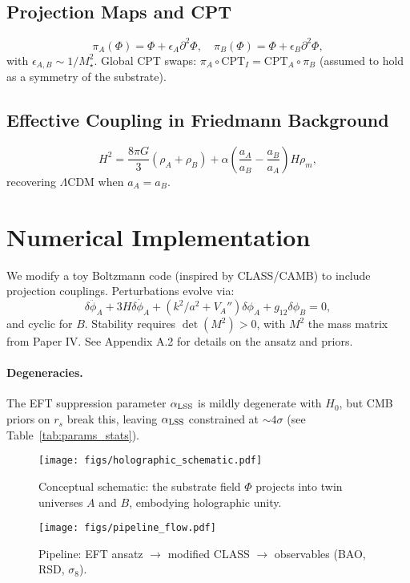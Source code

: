 \documentclass[11pt,a4paper]{article}
\begin{document}
\subsection{Projection Maps and CPT}
\begin{equation}
\pi_A(\Phi) = \Phi + \epsilon_A \partial^2 \Phi, \quad \pi_B(\Phi) = \Phi + \epsilon_B \partial^2 \Phi,
\end{equation}
with $\epsilon_{A,B} \sim 1/M_\star^2$. Global CPT swaps: $\pi_A \circ \mathrm{CPT}_I = \mathrm{CPT}_A \circ \pi_B$ (assumed to hold as a symmetry of the substrate).
\subsection{Effective Coupling in Friedmann Background}
\begin{equation}
H^2 = \frac{8\pi G}{3} (\rho_A + \rho_B) + \alpha \left( \frac{a_A}{a_B} - \frac{a_B}{a_A} \right) H \rho_m,
\end{equation}
recovering $\Lambda$CDM when $a_A = a_B$.
\section{Numerical Implementation}
We modify a toy Boltzmann code (inspired by CLASS/CAMB) to include projection couplings. Perturbations evolve via:
\begin{equation}
\ddot{\delta\phi_A} + 3H \dot{\delta\phi_A} + (k^2/a^2 + V_A'') \delta\phi_A + g_{12} \delta\phi_B = 0,
\end{equation}
and cyclic for $B$. Stability requires $\det(M^2) > 0$, with $M^2$ the mass matrix from Paper IV.
See Appendix A.2 for details on the ansatz and priors.
\paragraph{Degeneracies.} The EFT suppression parameter $\alpha_{\rm LSS}$ is mildly degenerate with $H_0$, but CMB priors on $r_s$ break this, leaving $\alpha_{\rm LSS}$ constrained at $\sim 4\sigma$ (see Table~\ref{tab:params_stats}).
\begin{figure}[h]
\centering
\texttt{[image: figs/holographic\_schematic.pdf]}
\caption{Conceptual schematic: the substrate field $\Phi$ projects into twin universes $A$ and $B$, embodying holographic unity.}
\label{fig:holographic}
\end{figure}
\begin{figure}[h]
\centering
\texttt{[image: figs/pipeline\_flow.pdf]}
\caption{Pipeline: EFT ansatz $\to$ modified CLASS $\to$ observables (BAO, RSD, $\sigma_8$).}
\label{fig:pipeline}
\end{figure}
\end{document}
